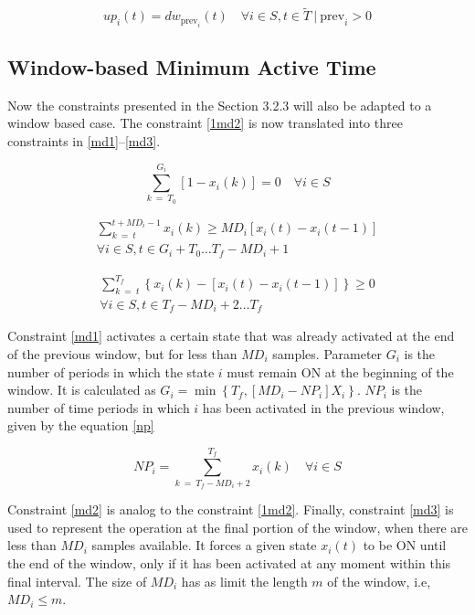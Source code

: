 \begin{equation} \label{2state}
    up_i(t) = dw_{\text{prev}_i}(t) \quad \forall i \in S, t \in \tilde{T} \ | \ \text{prev}_i>0
\end{equation}


\subsection{Window-based Minimum Active Time}

Now the constraints presented in the Section 3.2.3 will also be adapted to a window based case. The constraint \eqref{1md2} is now translated into three constraints in \eqref{md1}--\eqref{md3}. 

\begin{equation}\label{md1}
    \sum_{k\ =\ T_0}^{G_i} \left[ 1 - x_i(k) \right] = 0 \quad \forall i \in S
\end{equation}

\begin{multline}\label{md2}
    \sum_{k\ =\ t}^{t+MD_i-1} x_i(k) \geq MD_i \left[ x_i(t) - x_i(t-1) \right] \\
    \forall i \in S, t \in G_i + T_0 \hdots T_f - {MD}_i + 1
\end{multline}

\begin{multline} \label{md3}
    \sum_{k\ =\ t}^{T_f} \left\{ x_i(k) - \left[ x_i(t) - x_i(t-1) \right] \right\} \geq 0 \\
    \forall i \in S, t \in T_f - MD_i + 2 \hdots T_f 
\end{multline}

Constraint \eqref{md1} activates a certain state that was already activated at the end of the previous window, but for less than $MD_i$ samples. Parameter $G_i$ is the number of periods in which the state $i$ must remain ON at the beginning of the window. It is calculated as $G_i = \min \left\{ T_f, \left[ MD_i - NP_i \right] X_i \right\}$. $NP_i$ is the number of time periods in which $i$ has been activated in the previous window, given by the equation \eqref{np}

\begin{equation} \label{np}
    NP_i = \sum_{k\ =\ T_f - MD_i + 2}^{T_f} { x_i(k) } \quad \forall i \in S
\end{equation}

Constraint \eqref{md2} is analog to the constraint \eqref{1md2}. Finally, constraint \eqref{md3} is used to represent the operation at the final portion of the window, when there are less than $MD_i$ samples available. It forces a given state $x_i(t)$ to be ON until the end of the window, only if it has been activated at any moment within this final interval. The size of $MD_i$ has as limit the length $m$ of the window, i.e, $MD_i \leq m$. 

